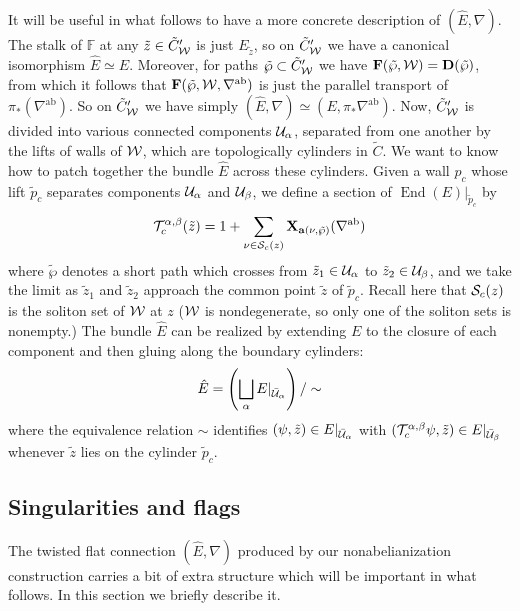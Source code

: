 \documentclass[11pt,a4paper]{article}
\def\twp{\tilde\wp}
\def\wnet {{\cal W}}
\def\CS {{\cal S}}
\def\CU{{\cal U}}
\def\CT{{\cal T}}
\def\ab{{\mathrm{ab}}}
\def\tz{{\tilde z}}
\def\ba{\mathbf{a}}
\def\bD{\mathbf{D}}
\def\bF{\mathbf{F}}
\def\bX{\mathbf{X}}
\def\wnet {{\cal W}}
\def\CS {{\cal S}}
\def\CU{{\cal U}}
\def\CT{{\cal T}}
\DeclareMathOperator{\End}{{End}}
\begin{document}
It will be useful in what follows to have a more concrete description of $({\hat E}, \nabla)$.
The stalk of $\mathbb F$ at any $\tz \in \tilde C'_\wnet$ is just $E_{\tz}$, so
on $\tilde C'_\wnet$ we have a canonical isomorphism ${\hat E} \simeq E$.  Moreover, for
paths $\tilde \wp \subset \tilde C'_\wnet$ we have $\bF(\tilde \wp, \wnet) = \bD(\tilde \wp)$,
from which it follows that $\bF(\tilde \wp, \wnet, \nabla^\ab)$ is just the
parallel transport of $\pi_*(\nabla^\ab)$.  So on $\tilde C'_\wnet$ we have
simply $({\hat E}, \nabla) \simeq (E, \pi_* \nabla^\ab)$.
Now, $\tilde C'_\wnet$ is divided into various connected components $\CU_{\alpha}$,
separated from one another by the lifts of walls of $\wnet$, which are topologically cylinders in $\tilde C$.
We want to know how to patch together the bundle ${\hat E}$ across these cylinders.
Given a wall $p_c$ whose lift $\tilde p_c$ separates components $\CU_{\alpha}$ and $\CU_{\beta}$, we define
a section of $\End(E) \vert_{\tilde p_c}$ by
\begin{equation}\label{eq:tran-fn}
 \CT_c^{\alpha,\beta}(\tz) = 1 + \sum_{\nu \in {\CS}_c(z)} \bX_{\ba(\nu, \twp)}(\nabla^\ab)
\end{equation}
where $\twp$ denotes a short path which crosses from
$\tz_1 \in \CU_{\alpha}$ to $\tz_2 \in \CU_{\beta}$,
and we take the limit
as $\tz_1$ and $\tz_2$ approach the common point $\tz$ of $\tilde p_c$.
Recall here that $\CS_c(z)$ is the soliton set of $\wnet$ at $z$ ($\wnet$
is nondegenerate, so only one of the soliton sets is nonempty.)
The bundle ${\hat E}$ can be realized by extending $E$ to the closure of each component
and then gluing along the boundary cylinders:
\begin{equation}
 {\hat E} = \left( \bigsqcup_\alpha E \vert_{\bar \CU_{\alpha}} \right) / \sim
\end{equation}
where the equivalence relation $\sim$ identifies $(\psi, \tz) \in E \vert_{\bar \CU_{\alpha}}$
with $(\CT_{c}^{\alpha,\beta} \psi, \tz) \in E \vert_{\bar \CU_{\beta}}$ whenever $\tz$ lies on the cylinder
$\tilde p_c$.



\subsection{Singularities and flags} \label{sec:flags}

The twisted flat connection $({\hat E}, \nabla)$
produced by our nonabelianization construction carries a
bit of extra structure which will be important in what follows.
In this section we briefly describe it.
\end{document}
